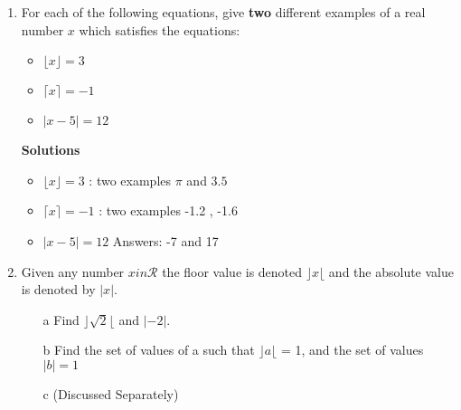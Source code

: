 \documentclass[]{article}
\begin{document}
\begin{enumerate}
\begin{framed}
\end{framed}

\item 


For each of the following equations, give \textbf{two} different examples of a real number $x$ which 
satisfies the equations:
\begin{itemize}
\item $\lfloor x \rfloor = 3 $
\item $\lceil x \rceil = -1 $
\item $| x-5 | =12 $
\end{itemize}

\begin{framed}
\textbf{Solutions}
\begin{itemize}
\item $\lfloor x \rfloor = 3 $ : two examples $\pi$ and $3.5$
\item $\lceil x \rceil = -1 $ : two examples -1.2 , -1.6
\item $| x-5 | =12 $  Answers: -7 and 17
\end{itemize}
\end{framed}

\item 
Given any number $x in \mathcal{R}$ the floor value is denoted $\rfloor x \lfloor$ and the absolute value is denoted by $|x|$.

\begin{itemize}
\item[a] Find $\rfloor \sqrt{2} \lfloor$ and $|-2|$.
\item[b] Find the set of values of a such that $\rfloor a \lfloor$ = 1, and the set of values $|b| = 1$
\item[c] (Discussed Separately)
\end{itemize}


\end{enumerate}
\end{document}
